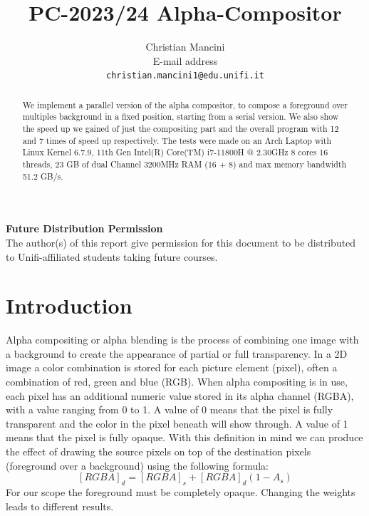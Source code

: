 \documentclass[10pt,twocolumn,letterpaper,english]{article}
\begin{document}
\title{PC-2023/24 Alpha-Compositor}

\author{Christian Mancini\\
E-mail address\\
{\tt\small christian.mancini1@edu.unifi.it}
}

\maketitle
\thispagestyle{empty}

\begin{abstract}
We implement a parallel version of the alpha compositor, to compose a foreground over multiples  background in a fixed position, starting from a serial version. We also show the speed up we gained of just the compositing part and the overall program with 12 and 7 times of speed up respectively. The tests were made on an Arch Laptop with Linux Kernel 6.7.9, 11th Gen Intel(R) Core(TM) i7-11800H @ 2.30GHz 8 cores 16 threads,  23 GB of dual Channel 3200MHz RAM (16 + 8) and max memory bandwidth 51.2 GB/s.
\end{abstract}

\noindent\large\textbf{Future Distribution Permission}\\
\indent The author(s) of this report give permission for this document to be distributed to Unifi-affiliated students taking future courses.

\section{Introduction}

Alpha compositing or alpha blending is the process of combining one image with a background to create the appearance of partial or full transparency. In a 2D image a color combination is stored for each picture element (pixel), often a combination of red, green and blue (RGB). When alpha compositing is in use, each pixel has an additional numeric value stored in its alpha channel (RGBA), with a value ranging from 0 to 1. A value of 0 means that the pixel is fully transparent and the color in the pixel beneath will show through. A value of 1 means that the pixel is fully opaque. 
With this definition in mind we can produce the effect of drawing the
source pixels on top of the destination pixels (foreground over a background) using the following formula: 
\begin{equation}\label{eq:composting}
	[RGBA]_d = [RGBA]_s + [RGBA]_d(1-A_s)
\end{equation}
For our scope the foreground must be completely opaque. Changing the weights leads to different results. 
\end{document}
